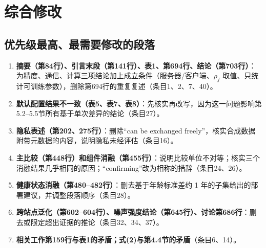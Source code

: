 \documentclass[11pt,a4paper]{ctexart}
\begin{document}
\section{综合修改}

\subsection{优先级最高、最需要修改的段落}
\begin{enumerate}[leftmargin=*]
\item \textbf{摘要（第84行）、引言末段（第141行）、表1、第694行、结论（第703行）}：为精度、通信、计算三项结论加上成立条件（服务器/客户端、$\rho_f$ 取值、只统计可训练参数），删除第694行的重复复述（条目1、2、7、40）。
\item \textbf{默认配置结果不一致（表5、表7、表8）}：先核实再改写，因为这一问题影响第5.2--5.5节所有基于单次差异的结论（条目27）。
\item \textbf{隐私表述（第202、275行）}：删除“can be exchanged freely”，核实合成数据附带元数据的内容，说明隐私未经评估（条目16）。
\item \textbf{主比较（第448行）和组件消融（第455行）}：说明比较单位不对等；核实三个消融结果几乎相同的原因；“confirming”改为相称的措辞（条目24、26）。
\item \textbf{健康状态消融（第480--482行）}：删去基于年龄标准差约 1 年的子集给出的部署建议，并调整段落顺序（条目28）。
\item \textbf{跨站点泛化（第602--604行）、噪声强度结论（第645行）、讨论第686行}：删去或限定超出证据的推论（条目32、34、37）。
\item \textbf{相关工作第159行与表1的矛盾；式(2)与第4.4节的矛盾}（条目6、14）。
\end{enumerate}
\end{document}

